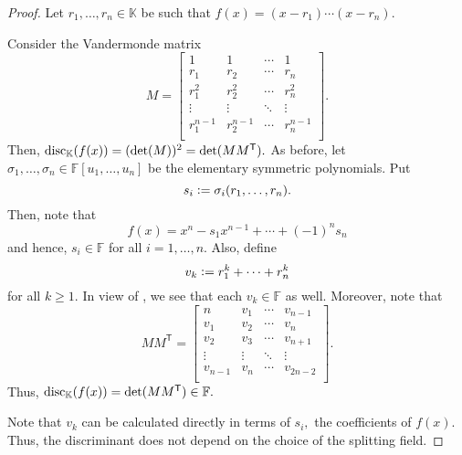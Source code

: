 \independencediscriminant*\label{prop:independencediscriminant2}
\begin{flushright}\hyperref[prop:independencediscriminant]{\upsym}\end{flushright}
\begin{proof}
    Let $r_1, \ldots, r_n \in \mathbb{K}$ be such that $f(x) = (x - r_1) \cdots (x - r_n).$

    Consider the Vandermonde matrix
    \begin{equation*} 
        M = \begin{bmatrix}
            1 & 1 & \cdots & 1\\
            r_1 & r_2 & \cdots & r_n\\
            r_1^2 & r_2^2 & \cdots & r_n^2\\
            \vdots & \vdots & \ddots & \vdots \\
            r_1^{n - 1} & r_2^{n - 1} & \cdots & r_n^{n - 1}\\
        \end{bmatrix}.
    \end{equation*}
    Then, $\operatorname{disc}_{\mathbb{K}}(f(x)) = (\det(M))^2 = \det(MM^{\mathsf{T}}).$ As before, let $\sigma_1, \ldots, \sigma_n \in \mathbb{F}[u_1, \ldots, u_n]$ be the elementary symmetric polynomials. Put
    \begin{equation*} 
        s_i \vcentcolon= \sigma_i(r_1, \ldots, r_n).
    \end{equation*}
    Then, note that
    \begin{equation*} 
        f(x) = x^n - s_1x^{n - 1} + \cdots + (-1)^ns_n
    \end{equation*}
    and hence, $s_i \in \mathbb{F}$ for all $i = 1, \ldots, n.$ Also, define
    \begin{equation*} 
        v_k \vcentcolon= r_1^k + \cdots + r_n^k
    \end{equation*}
    for all $k \ge 1.$ In view of , we see that each $v_k \in \mathbb{F}$ as well. Moreover, note that
    \begin{equation*} 
        MM^{\mathsf{T}} = \begin{bmatrix}
            n & v_1 & \cdots & v_{n - 1}\\
            v_1 & v_2 & \cdots & v_n\\
            v_2 & v_3 & \cdots & v_{n + 1}\\
            \vdots & \vdots & \ddots & \vdots \\
            v_{n - 1} & v_n & \cdots & v_{2n - 2}\\
        \end{bmatrix}.
    \end{equation*} 
    Thus, $\operatorname{disc}_{\mathbb{K}}(f(x)) = \det(MM^{\mathsf{T}}) \in \mathbb{F}.$

    Note that $v_k$ can be calculated directly in terms of $s_i,$ the coefficients of $f(x).$ Thus, the discriminant does not depend on the choice of the splitting field.
\end{proof}

